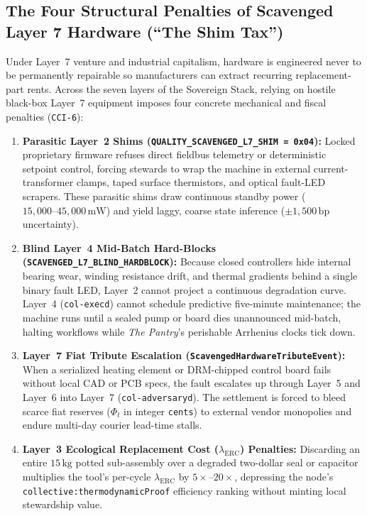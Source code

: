 \subsection{The Four Structural Penalties of Scavenged Layer 7 Hardware (``The Shim Tax'')}

Under Layer~7 venture and industrial capitalism, hardware is engineered never to be permanently repairable so manufacturers can extract recurring replacement-part rents. Across the seven layers of the Sovereign Stack, relying on hostile black-box Layer~7 equipment imposes four concrete mechanical and fiscal penalties (\texttt{CCI-6}):
\begin{enumerate}
  \item \textbf{Parasitic Layer~2 Shims (\texttt{QUALITY\_SCAVENGED\_L7\_SHIM = 0x04}):} Locked proprietary firmware refuses direct fieldbus telemetry or deterministic setpoint control, forcing stewards to wrap the machine in external current-transformer clamps, taped surface thermistors, and optical fault-LED scrapers. These parasitic shims draw continuous standby power ($15{,}000\text{--}45{,}000\,\mathrm{mW}$) and yield laggy, coarse state inference ($\pm 1{,}500\,\mathrm{bp}$ uncertainty).
  \item \textbf{Blind Layer~4 Mid-Batch Hard-Blocks (\texttt{SCAVENGED\_L7\_BLIND\_HARDBLOCK}):} Because closed controllers hide internal bearing wear, winding resistance drift, and thermal gradients behind a single binary fault LED, Layer~2 cannot project a continuous degradation curve. Layer~4 (\texttt{col-execd}) cannot schedule predictive five-minute maintenance; the machine runs until a sealed pump or board dies unannounced mid-batch, halting workflows while \textit{The Pantry}'s perishable Arrhenius clocks tick down.
  \item \textbf{Layer~7 Fiat Tribute Escalation (\texttt{ScavengedHardwareTributeEvent}):} When a serialized heating element or DRM-chipped control board fails without local CAD or PCB specs, the fault escalates up through Layer~5 and Layer~6 into Layer~7 (\texttt{col-adversaryd}). The settlement is forced to bleed scarce fiat reserves ($\Phi_t$ in integer \texttt{cents}) to external vendor monopolies and endure multi-day courier lead-time stalls.
  \item \textbf{Layer~3 Ecological Replacement Cost ($\lambda_{\mathrm{ERC}}$) Penalties:} Discarding an entire $15\,\mathrm{kg}$ potted sub-assembly over a degraded two-dollar seal or capacitor multiplies the tool's per-cycle $\lambda_{\mathrm{ERC}}$ by $5\times\text{--}20\times$, depressing the node's \texttt{collective:thermodynamicProof} efficiency ranking without minting local stewardship value.
\end{enumerate}

